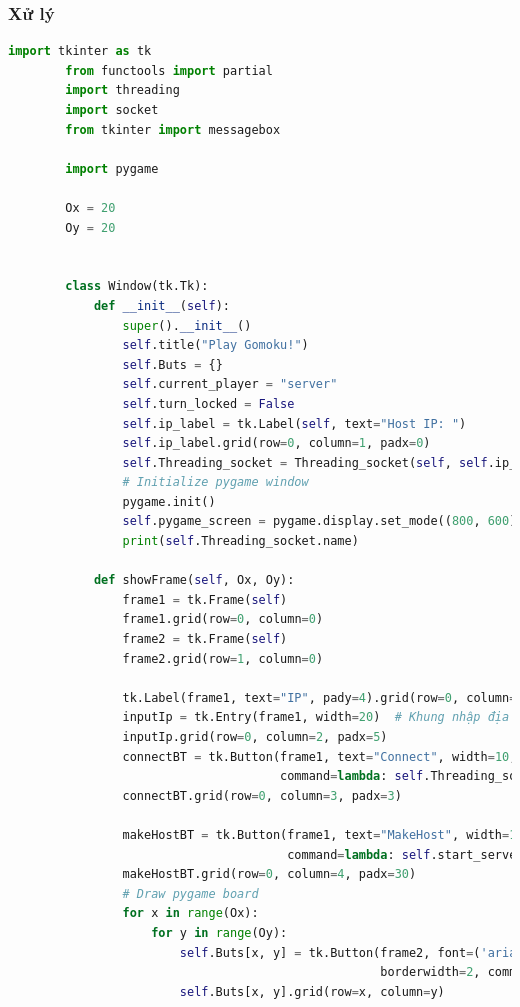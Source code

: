 \documentclass[a4paper]{article}
\begin{document}
    \subsubsection{Xử lý}
    \begin{lstlisting}[language=Python]
        import tkinter as tk
        from functools import partial
        import threading
        import socket
        from tkinter import messagebox
        
        import pygame
        
        Ox = 20
        Oy = 20
        
        
        class Window(tk.Tk):
            def __init__(self):
                super().__init__()
                self.title("Play Gomoku!")
                self.Buts = {}
                self.current_player = "server"
                self.turn_locked = False
                self.ip_label = tk.Label(self, text="Host IP: ")
                self.ip_label.grid(row=0, column=1, padx=0)
                self.Threading_socket = Threading_socket(self, self.ip_label)
                # Initialize pygame window
                pygame.init()
                self.pygame_screen = pygame.display.set_mode((800, 600))
                print(self.Threading_socket.name)
        
            def showFrame(self, Ox, Oy):
                frame1 = tk.Frame(self)
                frame1.grid(row=0, column=0)
                frame2 = tk.Frame(self)
                frame2.grid(row=1, column=0)
        
                tk.Label(frame1, text="IP", pady=4).grid(row=0, column=1)
                inputIp = tk.Entry(frame1, width=20)  # Khung nhập địa chỉ ip
                inputIp.grid(row=0, column=2, padx=5)
                connectBT = tk.Button(frame1, text="Connect", width=10,
                                      command=lambda: self.Threading_socket.clientAction(inputIp.get()))
                connectBT.grid(row=0, column=3, padx=3)
        
                makeHostBT = tk.Button(frame1, text="MakeHost", width=10,
                                       command=lambda: self.start_server_thread())
                makeHostBT.grid(row=0, column=4, padx=30)
                # Draw pygame board
                for x in range(Ox):
                    for y in range(Oy):
                        self.Buts[x, y] = tk.Button(frame2, font=('arial', 15, 'bold'), height=1, width=2,
                                                    borderwidth=2, command=partial(self.handleButton, x=x, y=y))
                        self.Buts[x, y].grid(row=x, column=y)
        

\end{lstlisting}
\end{document}
